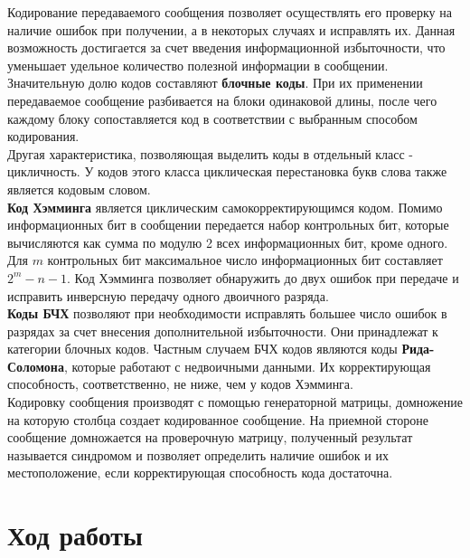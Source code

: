 \documentclass[10pt,a4paper,oneside]{article}
\begin{document}
\hspace{0,5cm}  Кодирование передаваемого сообщения позволяет осуществлять его проверку на наличие ошибок при получении, а в некоторых случаях и исправлять их. Данная возможность достигается за счет введения информационной избыточности, что уменьшает удельное количество полезной информации в сообщении.\\


Значительную долю кодов составляют \textbf{блочные коды}. При их применении передаваемое сообщение разбивается на блоки одинаковой длины, после чего каждому блоку сопоставляется код в соответствии с выбранным способом кодирования.\\


Другая характеристика, позволяющая выделить коды в отдельный класс - цикличность. У кодов этого класса циклическая перестановка букв слова также является кодовым словом.\\


\textbf{Код Хэмминга} является циклическим самокорректирующимся кодом.
Помимо информационных бит в сообщении передается набор контрольных бит, которые вычисляются как сумма по модулю 2 всех информационных бит, кроме одного. Для $m$ контрольных бит максимальное число информационных бит составляет $2^m-n-1$. Код Хэмминга позволяет обнаружить до двух ошибок при передаче и исправить инверсную передачу одного двоичного разряда. \\


\textbf{Коды БЧХ} позволяют при необходимости исправлять большее число ошибок в разрядах за счет внесения дополнительной избыточности. Они принадлежат к  категории блочных кодов. Частным случаем БЧХ кодов являются коды \textbf{Рида-Соломона}, которые работают с недвоичными данными. Их корректирующая способность, соответственно, не ниже, чем у кодов Хэмминга.\\


Кодировку сообщения производят с помощью генераторной матрицы, домножение на которую столбца создает кодированное сообщение. На приемной стороне сообщение домножается на проверочную матрицу, полученный результат называется синдромом и позволяет определить наличие ошибок и их местоположение, если корректирующая способность кода достаточна.\\


\section{Ход работы}
\end{document}
